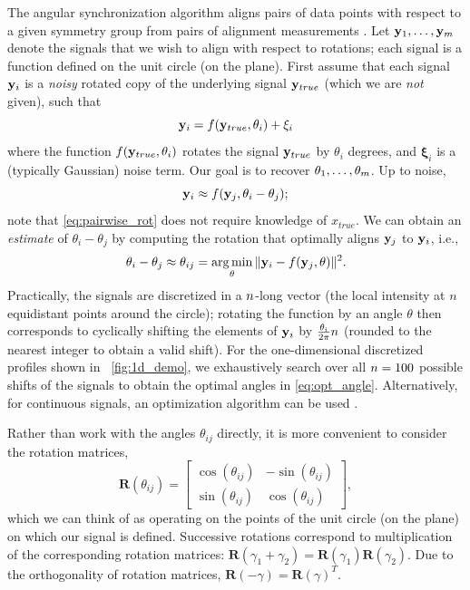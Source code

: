 The angular synchronization algorithm aligns pairs of data points with respect to a given symmetry group from pairs of alignment measurements \citep{singer2011angular}. 
%
Let $ \mathbf{y}_1, \dots, \mathbf{y}_m$ denote the signals that we wish to align with respect to rotations;
each signal is a function defined on the unit circle (on the plane).
%
First assume that each signal $\mathbf{y}_i$ is a {\it noisy} rotated copy of the underlying signal $\mathbf{y}_{true}$
(which we are {\it not} given), such that
\begin{equation}
\mathbf{y}_i = f(\mathbf{y}_{true}, \theta_i) + \mathbf{\xi}_i
\end{equation}
where the function $f(\mathbf{y}_{true}, \theta_i)$ rotates the signal $\mathbf{y}_{true}$ by $\theta_i$ degrees, and $\mathbf{\xi}_i$ is a (typically Gaussian) noise term.
%
Our goal is to recover $\theta_1, \dots, \theta_m$.
%
Up to noise,
\begin{equation} \label{eq:pairwise_rot}
\mathbf{y}_i \approx f(\mathbf{y}_j, \theta_i - \theta_j) ;
\end{equation}
note that \eqref{eq:pairwise_rot} does not require knowledge of $x_{true}$.
%
We can obtain an {\it estimate} of $\theta_i - \theta_j$ by computing the rotation that optimally aligns $\mathbf{y}_j$ to $\mathbf{y}_i$,
i.e., %
%
\begin{equation} \label{eq:opt_angle}
\theta_i - \theta_j \approx \theta_{ij} = \operatorname*{arg\,min}_{\theta} \|\mathbf{y}_i - f(\mathbf{y}_j, \theta)\|^2.
\end{equation}
%
Practically, the signals are discretized in a $n$-long vector (the local intensity at $n$ equidistant points around the circle);
rotating the function by an angle $\theta$ then corresponds to cyclically shifting the elements of $\mathbf{y}_i$
by $\frac{\theta_i}{2 \pi} n$ (rounded to the nearest integer to obtain a valid shift).
%
For the one-dimensional discretized profiles shown in \fig~\ref{fig:1d_demo}, we exhaustively search over all $n=100$ possible shifts of the signals to obtain the optimal angles in \eqref{eq:opt_angle}.
%
Alternatively, for continuous signals, an optimization algorithm
can be used \citep{ahuja2007template}.

Rather than work with the angles $\theta_{ij}$ directly, it is more convenient to consider the rotation matrices,
\begin{equation} \label{eq:R_theta}
\mathbf{R}(\theta_{ij}) = \begin{bmatrix}
\cos(\theta_{ij}) & -\sin(\theta_{ij}) \\
\sin(\theta_{ij}) & \cos(\theta_{ij})
\end{bmatrix},
\end{equation}
which we can think of as operating on the points of the unit circle (on the plane) on which our signal is defined.
%
Successive rotations correspond to multiplication of the corresponding rotation matrices: $\mathbf{R}(\gamma_1 + \gamma_2) = \mathbf{R}(\gamma_1) \mathbf{R}(\gamma_2)$.
%
Due to the orthogonality of rotation matrices, $\mathbf{R}(-\gamma) = \mathbf{R}(\gamma)^T$.

